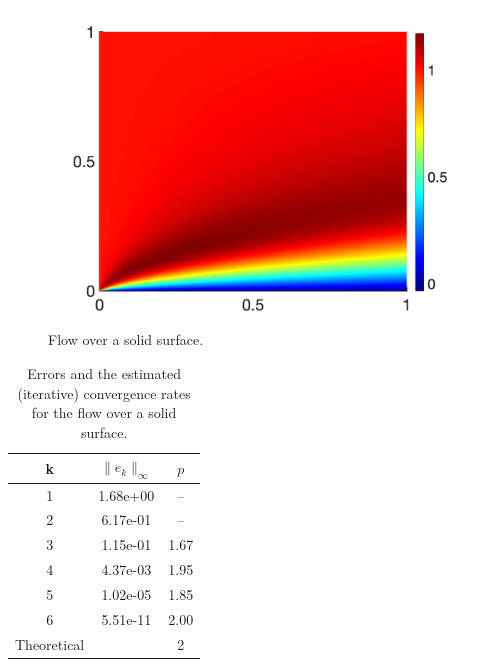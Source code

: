 \begin{figure}
  \centering
  \includegraphics[scale = 0.3]{images/boundary_layer}
  \caption{Flow over a solid surface.}
  \label{fig:boundary_layer}
\end{figure}

\begin{table}
  \centering
  \caption{Errors and the estimated (iterative) convergence rates for the flow over a solid surface.}
  \begin{tabular}{c| cc }
   \hline
  k & $\|e_k\|_\infty$ & $p$
  \\
  \hline
  1 & 1.68e+00  & --  \\
  2 & 6.17e-01  & --  \\
  3 & 1.15e-01  & 1.67 \\
  4 & 4.37e-03  & 1.95 \\
  5 & 1.02e-05  & 1.85 \\
  6 & 5.51e-11  & 2.00 \\
  \hline
  Theoretical && 2
  \end{tabular}
  \label{tab:boundary_layer}
\end{table}

